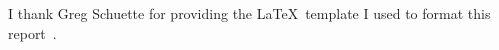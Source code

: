 \lipsum[6]

I thank Greg Schuette for providing the \LaTeX\ template I used to format this report~\cite{schuette_template_2023}. 